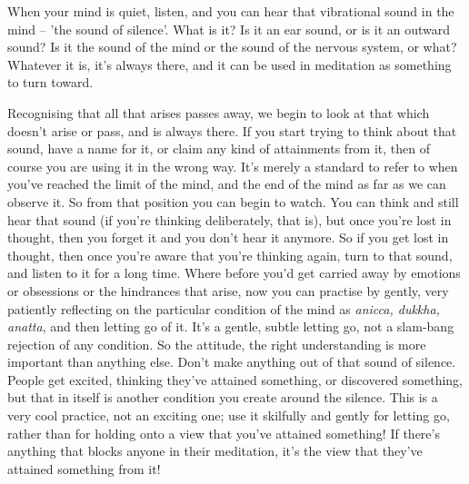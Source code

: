 
When your mind is quiet, listen, and you can hear that vibrational sound in the mind -- 'the sound of silence'. What is it? Is it an ear sound, or is it an outward sound? Is it the sound of the mind or the sound of the nervous system, or what? Whatever it is, it's always there, and it can be used in meditation as something to turn toward.

Recognising that all that arises passes away, we begin to look at that which doesn't arise or pass, and is always there. If you start trying to think about that sound, have a name for it, or claim any kind of attainments from it, then of course you are using it in the wrong way. It's merely a standard to refer to when you've reached the limit of the mind, and the end of the mind as far as we can observe it. So from that position you can begin to watch. You can think and still hear that sound (if you're thinking deliberately, that is), but once you're lost in thought, then you forget it and you don't hear it anymore. So if you get lost in thought, then once you're aware that you're thinking again, turn to that sound, and listen to it for a long time. Where before you'd get carried away by emotions or obsessions or the hindrances that arise, now you can practise by gently, very patiently reflecting on the particular condition of the mind as \textit{anicca, dukkha, anatta}, and then letting go of it. It's a gentle, subtle letting go, not a slam-bang rejection of any condition. So the attitude, the right understanding is more important than anything else. Don't make anything out of that sound of silence. People get excited, thinking they've attained something, or discovered something, but that in itself is another condition you create around the silence. This is a very cool practice, not an exciting one; use it skilfully and gently for letting go, rather than for holding onto a view that you've attained something! If there's anything that blocks anyone in their meditation, it's the view that they've attained something from it!


